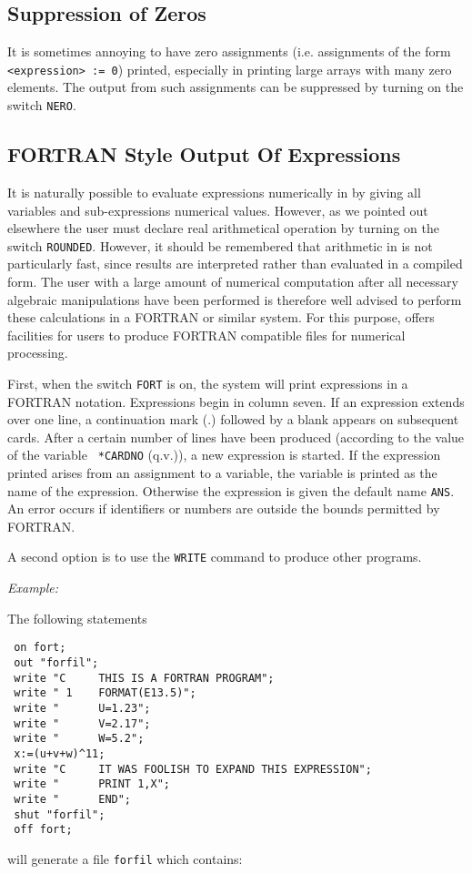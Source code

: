 \subsection{Suppression of Zeros}

It is sometimes annoying to have zero assignments (i.e. assignments of the
form {\tt <expression> := 0}) printed, especially in printing large arrays
with many zero elements.  The output from such assignments can be
suppressed by turning on the switch {\tt NERO}. 

\subsection{{FORTRAN} Style Output Of Expressions}

It is naturally possible to evaluate expressions numerically in {\REDUCE} by
giving all variables and sub-expressions numerical values. However, as we
pointed out elsewhere the user must declare real arithmetical operation by
turning on the switch {\tt ROUNDED}.  However, it should be
remembered that arithmetic in {\REDUCE} is not particularly fast, since
results are interpreted rather than evaluated in a compiled form. The user
with a large amount of numerical computation after all necessary algebraic
manipulations have been performed is therefore well advised to perform
these calculations in a FORTRAN or similar system.  For
this purpose, {\REDUCE} offers facilities for users to produce FORTRAN
compatible files for numerical processing.

First, when the switch {\tt FORT}  is on, the system will
print expressions in a FORTRAN notation.  Expressions begin in column
seven.  If an expression extends over one line, a continuation mark (.)
followed by a blank appears on subsequent cards.  After a certain number
of lines have been produced (according to the value of the variable {\tt
*CARDNO} (q.v.)), a new expression is started.  If the expression printed
arises from an assignment to a variable, the variable is printed as the
name of the expression.  Otherwise the expression is given the default
name {\tt ANS}.  An error occurs if identifiers or numbers are outside the
bounds permitted by FORTRAN.

A second option is to use the {\tt WRITE} command to produce other programs.

{\it Example:}

The following {\REDUCE} statements
\begin{verbatim}
 on fort;
 out "forfil";
 write "C     THIS IS A FORTRAN PROGRAM";
 write " 1    FORMAT(E13.5)";
 write "      U=1.23";
 write "      V=2.17";
 write "      W=5.2";
 x:=(u+v+w)^11;
 write "C     IT WAS FOOLISH TO EXPAND THIS EXPRESSION";
 write "      PRINT 1,X";
 write "      END";
 shut "forfil";
 off fort;
\end{verbatim}
will generate a file {\tt forfil} which contains:

